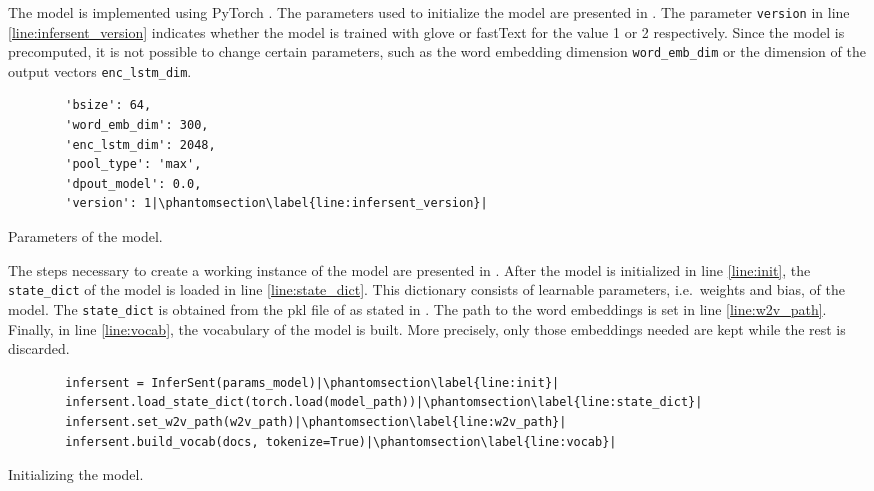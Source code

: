 \subsubsection*{\infersent{}}\label{subsubsec:impl-infersent}

The \infersent{} model is implemented using PyTorch \cite{HfsentTrans2019}.
The parameters used to initialize the model are presented in .
The parameter \texttt{version} in line \ref{line:infersent_version} indicates whether 
the model is trained with \acs{glove} or fastText for the value 1 or 2 respectively.
Since the model is precomputed, it is not possible to change certain parameters, 
such as the word embedding dimension \texttt{word\_emb\_dim} or the dimension of the output vectors \texttt{enc\_lstm\_dim}.

\begin{listing}[htp]
    \begin{verbatim}
        'bsize': 64, 
        'word_emb_dim': 300, 
        'enc_lstm_dim': 2048,  
        'pool_type': 'max', 
        'dpout_model': 0.0, 
        'version': 1|\phantomsection\label{line:infersent_version}|
    \end{verbatim}
    \caption{Parameters of the \infersent{} model.
    }
    \label{lst:infersent-params}
\end{listing}

The steps necessary to create a working instance of the \infersent{} model are presented in .
After the \infersent{} model is initialized in line \ref{line:init}, the \texttt{state\_dict} of the model is loaded in line \ref{line:state_dict}.
This dictionary consists of learnable parameters, i.e.\ weights and bias, of the model.
The \texttt{state\_dict} is obtained from the \ac{pkl} file of \infersent{} as stated in \cite{download-infersent}.
The path to the word embeddings is set in line \ref{line:w2v_path}.
Finally, in line \ref{line:vocab}, the vocabulary of the model is built. 
More precisely, only those embeddings needed are kept while the rest is discarded.

\begin{listing}[htp]
    \begin{verbatim}
        infersent = InferSent(params_model)|\phantomsection\label{line:init}|
        infersent.load_state_dict(torch.load(model_path))|\phantomsection\label{line:state_dict}|
        infersent.set_w2v_path(w2v_path)|\phantomsection\label{line:w2v_path}|
        infersent.build_vocab(docs, tokenize=True)|\phantomsection\label{line:vocab}|
    \end{verbatim}
    \caption{Initializing the \infersent{} model.
    }
    \label{lst:infersent-init}
\end{listing}

